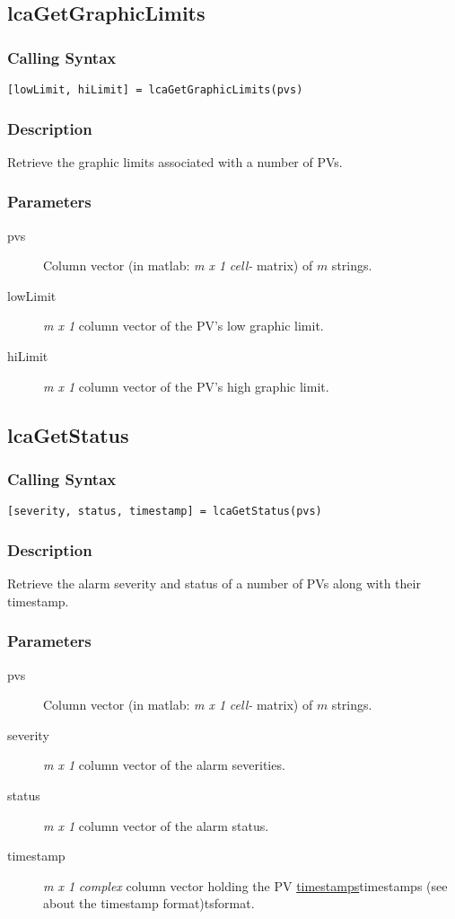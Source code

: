 \documentclass{article}
\newcommand{\ita}[1]{\emph{#1}}
\newcommand{\m}{$m$}
\newcommand{\mhack}{$m$} %
\newcommand{\mxl}{$m\times 1$}
\renewcommand{\m}{\ita{m}}
\newcommand{\mhack}{\ita{m}} %
\renewcommand{\mxl}{\ita{m x 1}}
\newcommand{\PVITEM}{
\item[pvs] Column vector (in matlab: \mxl{} \ita{cell-} matrix)
of \mhack{} strings.
}
\begin{document}
\subsection{lcaGetGraphicLimits}
\subsubsection{Calling Syntax}
\begin{verbatim}
[lowLimit, hiLimit] = lcaGetGraphicLimits(pvs)
\end{verbatim}
\subsubsection{Description}
Retrieve the graphic limits associated with a number of PVs.
\subsubsection{Parameters}
\begin{description}
\PVITEM
\item[lowLimit] \mxl{} column vector of the PV's low graphic limit.
\item[hiLimit]  \mxl{} column vector of the PV's high graphic limit.
\end{description}


\subsection{lcaGetStatus}
\subsubsection{Calling Syntax}
\begin{verbatim}
[severity, status, timestamp] = lcaGetStatus(pvs)
\end{verbatim}
\subsubsection{Description}
Retrieve the alarm severity and status of a number of PVs along
with their timestamp.
\subsubsection{Parameters}
\begin{description}
\PVITEM
\item[severity] \mxl{} column vector of the alarm severities.
\item[status] \mxl{} column vector of the alarm status.
\item[timestamp] \mxl{} \ita{complex} column vector holding the
PV \hyperref[ref]{timestamps}{timestamps (see }{ about the timestamp format)}{tsformat}.
\end{description}
\end{document}
